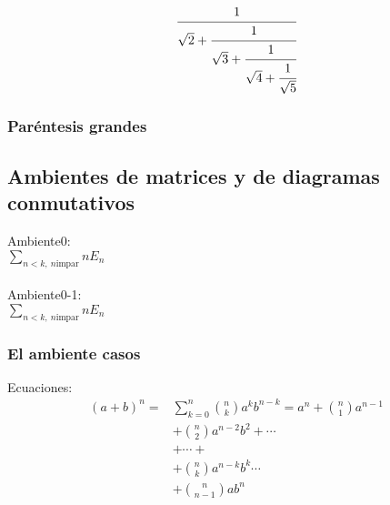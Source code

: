 \documentclass [spanish,12pt]{article}
\begin{document}
\begin{equation}
\cfrac{1}{\sqrt{2}+
\cfrac{1}{\sqrt{3}+
\cfrac{1}{\sqrt{4}+
\cfrac{1}{\sqrt{5}}}}}
\end{equation}


\subsubsection{Par\'entesis grandes}

\subsection{Ambientes de matrices y de diagramas conmutativos} 

Ambiente0:\\
$ \sum_{n<k, \ n \mbox{impar}}nE_n $
\\ \\
Ambiente0-1:\\
$ \sum_{n<k, \ n \mbox{impar}}nE_n $

\subsubsection{El ambiente casos}
Ecuaciones:\\
\begin{equation*}
\begin{split}
(a+b)^n = & \sum_{k=0}^n \binom{n}{k}a^kb^{n-k} = a^n + \binom{n}{1}a^{n-1} \\
& + \binom{n}{2}a^{n-2}b^2+\cdots \\
& + \cdots + \\
& + \binom{n}{k}a^{n-k}b^k \cdots \\
& + \binom{n}{n-1}ab^n
\end{split}
\end{equation*}
\end{document}
